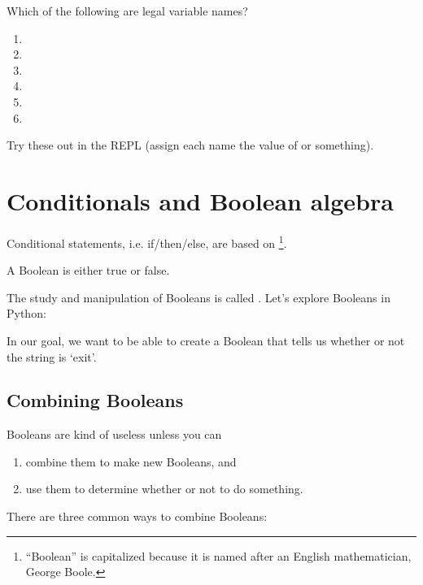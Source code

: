 \begin{exercise}
  Which of the following are legal variable names?

  \begin{enumerate}
  \item {}
  \item {}
  \item {}
  \item {}
  \item {}
  \item {}
  \end{enumerate}

  Try these out in the REPL (assign each name the value of  or
  something).
\end{exercise}

\section{Conditionals and Boolean algebra}

Conditional statements, i.e. if/then/else, are based on
\footnote{``Boolean'' is capitalized because it is
  named after an English mathematician, George Boole.}.

\begin{definition}
  A Boolean is either true or false.
\end{definition}

The study and manipulation of Booleans is called . Let's explore Booleans in Python:


In our goal, we want to be able to create a Boolean that tells us
whether or not the string is `exit'.

\subsection{Combining Booleans}

Booleans are kind of useless unless you can

\begin{enumerate}
\item combine them to make new Booleans, and
\item use them to determine whether or not to do something.
\end{enumerate}

There are three common ways to combine Booleans:

